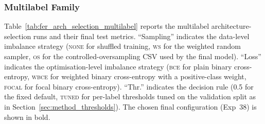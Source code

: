 \subsubsection{Multilabel Family}\label{sec:results_fer_multilabel_family}

Table~\ref{tab:fer_arch_selection_multilabel} reports the multilabel architecture-selection runs and their final test metrics. ``Sampling'' indicates the data-level imbalance strategy (\textsc{none} for shuffled training, \textsc{ws} for the weighted random sampler, \textsc{os} for the controlled-oversampling CSV used by the final model). ``Loss'' indicates the optimisation-level imbalance strategy (\textsc{bce} for plain binary cross-entropy, \textsc{wbce} for weighted binary cross-entropy with a positive-class weight, \textsc{focal} for focal binary cross-entropy). ``Thr.'' indicates the decision rule (\textsc{0.5} for the fixed default, \textsc{tuned} for per-label thresholds tuned on the validation split as in Section~\ref{sec:method_thresholds}). The chosen final configuration (Exp~38) is shown in bold.

